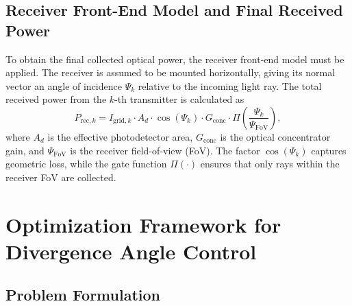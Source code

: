 \documentclass[twocolumn,twoside]{IEEEtran}
\theoremstyle{break}
\begin{document}
	\vspace{-2mm}
	\subsection{Receiver Front-End Model and Final Received Power}
	 To obtain the final collected optical power, the receiver front-end model must be applied. The receiver is assumed to be mounted horizontally, giving its normal vector an angle of incidence $\Psi_{k}$ relative to the incoming light ray. The total received power from the $k$-th transmitter is calculated as \cite{VCSEL1}
	\begin{equation}
		P_{\text{rec}, k} = I_{\text{grid}, k} \cdot A_d \cdot \cos(\Psi_{k}) \cdot G_{\text{conc}} \cdot \Pi\!\left(\frac{\Psi_{k}}{\Psi_{\text{FoV}}}\right),
	\end{equation}
	where $A_d$ is the effective photodetector area, $G_{\text{conc}}$ is the optical concentrator gain, and $\Psi_{\text{FoV}}$ is the receiver field-of-view (FoV). The factor $\cos(\Psi_{k})$ captures geometric loss, while the gate function $\Pi(\cdot)$ ensures that only rays within the receiver FoV are collected.
	
	\section{Optimization Framework for Divergence Angle Control}
	\label{sec:optimization}
	
	\subsection{Problem Formulation}
	
\end{document}

